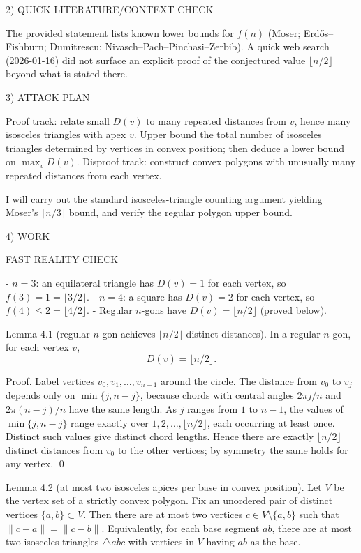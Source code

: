 2) QUICK LITERATURE/CONTEXT CHECK

The provided statement lists known lower bounds for $f(n)$ (Moser; Erd\H{o}s--Fishburn; Dumitrescu; Nivasch--Pach--Pinchasi--Zerbib).
A quick web search (2026-01-16) did not surface an explicit proof of the conjectured value $\lfloor n/2\rfloor$ beyond what is stated there.

3) ATTACK PLAN

Proof track: relate small $D(v)$ to many repeated distances from $v$, hence many isosceles triangles with apex $v$. Upper bound the total number of isosceles triangles determined by vertices in convex position; then deduce a lower bound on $\max_v D(v)$.
Disproof track: construct convex polygons with unusually many repeated distances from each vertex.

I will carry out the standard isosceles-triangle counting argument yielding Moser's $\lceil n/3\rceil$ bound, and verify the regular polygon upper bound.

4) WORK

FAST REALITY CHECK

- $n=3$: an equilateral triangle has $D(v)=1$ for each vertex, so $f(3)=1=\lfloor 3/2\rfloor$.
- $n=4$: a square has $D(v)=2$ for each vertex, so $f(4)\le 2=\lfloor 4/2\rfloor$.
- Regular $n$-gons have $D(v)=\lfloor n/2\rfloor$ (proved below).

Lemma 4.1 (regular $n$-gon achieves $\lfloor n/2\rfloor$ distinct distances).
In a regular $n$-gon, for each vertex $v$,
\[
D(v)=\lfloor n/2\rfloor.
\]

Proof.
Label vertices $v_0,v_1,\dots,v_{n-1}$ around the circle. The distance from $v_0$ to $v_j$ depends only on
$\min\{j,n-j\}$, because chords with central angles $2\pi j/n$ and $2\pi(n-j)/n$ have the same length.
As $j$ ranges from $1$ to $n-1$, the values of $\min\{j,n-j\}$ range exactly over
$1,2,\dots,\lfloor n/2\rfloor$, each occurring at least once. Distinct such values give distinct chord lengths.
Hence there are exactly $\lfloor n/2\rfloor$ distinct distances from $v_0$ to the other vertices; by symmetry the same holds for any vertex. \qed

Lemma 4.2 (at most two isosceles apices per base in convex position).
Let $V$ be the vertex set of a strictly convex polygon.
Fix an unordered pair of distinct vertices $\{a,b\}\subset V$.
Then there are at most two vertices $c\in V\setminus\{a,b\}$ such that $\|c-a\|=\|c-b\|$.
Equivalently, for each base segment $ab$, there are at most two isosceles triangles $\triangle abc$ with vertices in $V$ having $ab$ as the base.

